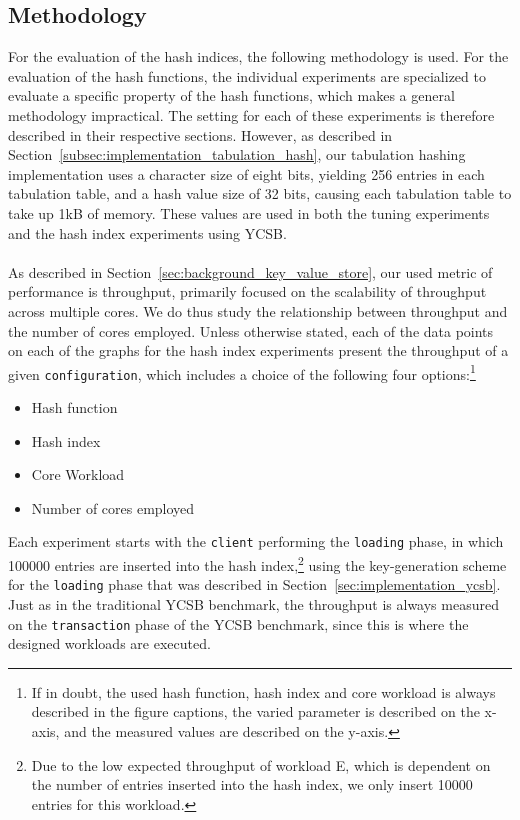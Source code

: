\documentclass[11pt]{report} %
\begin{document}
\subsection{Methodology}
\label{subsec:methodology}
For the evaluation of the hash indices, the following methodology is used. For the evaluation of the hash functions, the individual experiments are specialized to evaluate a specific property of the hash functions, which makes a general methodology impractical. The setting for each of these experiments is therefore described in their respective sections. However, as described in Section~\ref{subsec:implementation_tabulation_hash}, our tabulation hashing implementation uses a character size of eight bits, yielding 256 entries in each tabulation table, and a hash value size of 32 bits, causing each tabulation table to take up 1kB of memory. These values are used in both the tuning experiments and the hash index experiments using YCSB. \\
\\
As described in Section~\ref{sec:background_key_value_store}, our used metric of performance is throughput, primarily focused on the scalability of throughput across multiple cores. We do thus study the relationship between throughput and the number of cores employed. Unless otherwise stated, each of the data points on each of the graphs for the hash index experiments present the throughput of a given \verb|configuration|, which includes a choice of the following four options:\footnote{If in doubt, the used hash function, hash index and core workload is always described in the figure captions, the varied parameter is described on the x-axis, and the measured values are described on the y-axis.}
\begin{itemize}[noitemsep]
  \item Hash function
  \item Hash index
  \item Core Workload
  \item Number of cores employed
\end{itemize}
Each experiment starts with the \verb|client| performing the \verb|loading| phase, in which 100000 entries are inserted into the hash index,\footnote{Due to the low expected throughput of workload E, which is dependent on the number of entries inserted into the hash index, we only insert 10000 entries for this workload.} using the key-generation scheme for the \verb|loading| phase that was described in Section~\ref{sec:implementation_ycsb}. Just as in the traditional YCSB benchmark, the throughput is always measured on the \verb|transaction| phase of the YCSB benchmark, since this is where the designed workloads are executed. \\
\end{document}
